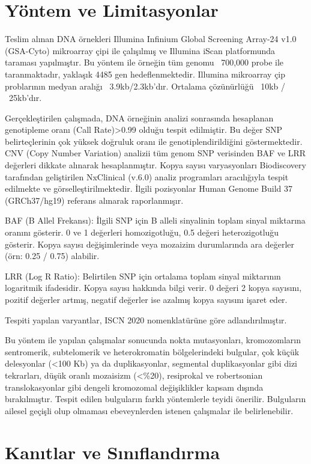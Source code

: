 \documentclass{article}
\begin{document}
\section{Yöntem ve Limitasyonlar}

Teslim alınan DNA örnekleri Illumina Infinium Global Screening Array-24 v1.0 (GSA-Cyto) mikroarray çipi ile çalışılmış ve Illumina iScan platformunda taraması yapılmıştır. Bu yöntem ile örneğin tüm genomu ~700,000 probe ile taranmaktadır, yaklaşık 4485 gen hedeflenmektedir. Illumina mikroarray çip problarının medyan aralığı ~3.9kb/2.3kb’dır. Ortalama çözünürlüğü ~10kb / ~25kb’dır.

Gerçekleştirilen çalışmada, DNA örneğinin analizi sonrasında hesaplanan genotipleme oranı (Call Rate)>0.99 olduğu tespit edilmiştir. Bu değer SNP belirteçlerinin çok yüksek doğruluk oranı ile genotiplendirildiğini göstermektedir. CNV (Copy Number Variation) analizii tüm genom SNP verisinden BAF ve LRR değerleri dikkate alınarak hesaplanmıştır. Kopya sayısı varyasyonları Biodiscovery tarafından geliştirilen NxClinical (v.6.0) analiz programları aracılığıyla tespit edilmekte ve görselleştirilmektedir. İlgili pozisyonlar Human Genome Build 37 (GRCh37/hg19) referans alınarak raporlanmışır.

BAF (B Allel Frekansı): İlgili SNP için B alleli sinyalinin toplam sinyal miktarına oranını gösterir. 0 ve 1 değerleri homozigotluğu, 0.5 değeri heterozigotluğu gösterir. Kopya sayısı değişimlerinde veya mozaizim durumlarında ara değerler (örn: 0.25 / 0.75) alabilir. 

LRR (Log R Ratio): Belirtilen SNP için ortalama toplam sinyal miktarının logaritmik ifadesidir. Kopya sayısı hakkında bilgi verir. 0 değeri 2 kopya sayısını, pozitif değerler artmış, negatif  değerler  ise  azalmış  kopya sayısını işaret eder.

Tespiti yapılan varyantlar, ISCN 2020 nomenklatürüne göre adlandırılmıştır.

Bu yöntem ile yapılan çalışmalar sonucunda nokta mutasyonları, kromozomların sentromerik, subtelomerik ve heterokromatin bölgelerindeki bulgular, çok küçük delesyonlar (<100 Kb) ya da duplikasyonlar, segmental duplikasyonlar gibi dizi tekrarları, düşük oranlı mozaisizm (<\%20), resiprokal ve robertsonian translokasyonlar gibi dengeli kromozomal değişiklikler kapsam dışında bırakılmıştır. Tespit edilen bulguların farklı yöntemlerle teyidi önerilir. Bulguların ailesel geçişli olup olmaması ebeveynlerden istenen çalışmalar ile belirlenebilir.

\section{Kanıtlar ve Sınıflandırma}
\end{document}
